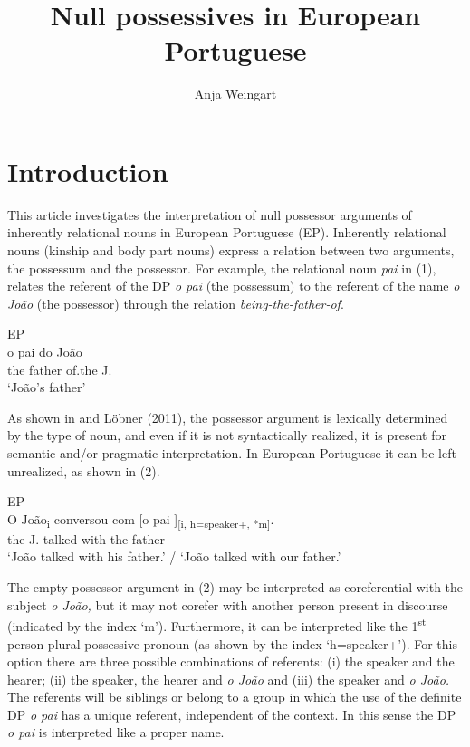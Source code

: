 \documentclass[output=paper]{langsci/langscibook}
\author{Anja Weingart\affiliation{Georg-August-Universität Göttingen}}
\title{Null possessives in European Portuguese}
\begin{document}
\section{Introduction}%

This article investigates the interpretation of null possessor arguments of inherently relational nouns in European Portuguese (EP). Inherently relational nouns (kinship and body part nouns) express a relation between two arguments, the possessum and the possessor. For example, the relational noun \textit{pai} in (1), relates the referent of the DP \textit{o pai} (the possessum) to the referent of the name \textit{o João} (the possessor) through the relation \textit{being-the-father-of}.

\ea%
         EP\label{ex:wein:1}\\
    \gll o   pai   do   João\\
         the   father of.the   J.\\
    \glt ‘João’s father’
    \z


As shown in \citet{Barker2011} and Löbner (2011), the possessor argument is lexically determined by the type of noun, and even if it is not syntactically realized, it is present for semantic and/or pragmatic interpretation. In European Portuguese it can be left unrealized, as shown in (2).

\ea%
         EP\label{ex:wein:2}\\
    \gll O  João\textsubscript{i}   conversou     com [o   pai ]\textsubscript{[i, h=speaker+, *m]}.\\
         the J.     talked   with the father\\
    \glt ‘João talked with his father.’ / ‘João talked with our father.’
\z

The empty possessor argument in (2) may be interpreted as coreferential with the subject \textit{o João,} but it may not corefer with another person present in discourse (indicated by the index ‘m’). Furthermore, it can be interpreted like the 1\textsuperscript{st} person plural possessive pronoun (as shown by the index ‘h=speaker+’). For this option there are three possible combinations of referents: (i) the speaker and the hearer; (ii) the speaker, the hearer and \textit{o João} and (iii) the speaker and \textit{o João.} The referents will be siblings or belong to a group in which the use of the definite DP \textit{o pai} has a unique referent, independent of the context. In this sense the DP \textit{o pai} is interpreted like a proper name.
\end{document}
